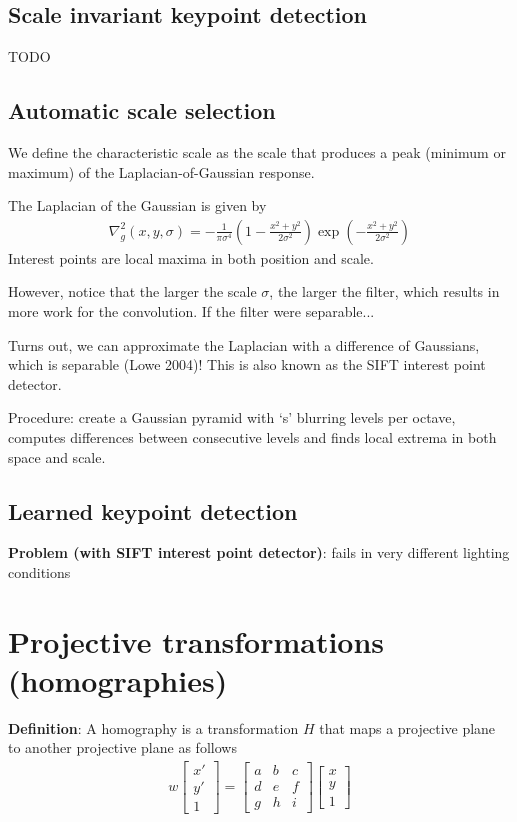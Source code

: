 \documentclass[11pt]{article}
\begin{document}
\subsection{Scale invariant keypoint detection}
TODO 
\subsection{Automatic scale selection}
We define the characteristic scale as the scale that produces a peak (minimum or maximum) of the Laplacian-of-Gaussian response. 

The Laplacian of the Gaussian is given by 
\begin{align*}
    \nabla^2_g (x, y, \sigma) = - \frac{1}{\pi \sigma^4} \left( 1 - \frac{x^2 + y^2}{2\sigma^2}\right) \exp\left( - \frac{x^2+y^2}{2\sigma^2} \right) 
\end{align*}
Interest points are local maxima in both position and scale. 

However, notice that the larger the scale $\sigma$, the larger the filter, which results in more work for the convolution. If the filter were separable...

Turns out, we can approximate the Laplacian with a difference of Gaussians, which is separable (Lowe 2004)! This is also known as the SIFT interest point detector. 

Procedure: create a Gaussian pyramid with `s' blurring levels per octave, computes differences between consecutive levels and finds local extrema in both space and scale. 

\subsection{Learned keypoint detection}

\textbf{Problem (with SIFT interest point detector)}: fails in very different lighting conditions

\section{Projective transformations (homographies)} \label{homographies}
\textbf{Definition}: A homography is a transformation $H$ that maps a projective plane to another projective plane as follows 
\begin{align*}
    w \begin{bmatrix}
        x' \\ y' \\ 1
    \end{bmatrix} = 
    \begin{bmatrix}
        a & b & c \\
        d & e & f \\
        g & h & i 
    \end{bmatrix}
    \begin{bmatrix}
        x \\ y \\ 1 
    \end{bmatrix}
\end{align*}
\end{document}

